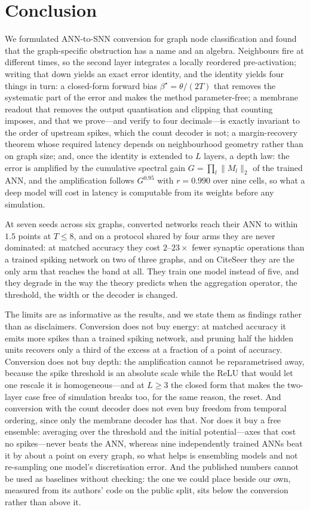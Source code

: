\documentclass[10pt,twocolumn]{article}
\newcommand{\betastar}{\beta^{\star}}
\begin{document}
\section{Conclusion}
\label{sec:conclusion}

We formulated ANN-to-SNN conversion for graph node classification and found that the graph-specific
obstruction has a name and an algebra. Neighbours fire at different times, so the second layer
integrates a locally reordered pre-activation; writing that down yields an exact error identity, and
the identity yields four things in turn: a closed-form forward bias $\betastar = \theta/(2T)$ that
removes the systematic part of the error and makes the method parameter-free; a membrane readout
that removes the output quantisation and clipping that counting imposes, and that we prove---and
verify to four decimals---is exactly invariant to the order of upstream spikes, which the count
decoder is not; a margin-recovery theorem whose required latency depends on neighbourhood geometry
rather than on graph size; and, once the identity is extended to $L$ layers, a depth law: the error
is amplified by the cumulative spectral gain $G=\prod_l\lVert M_l\rVert_2$ of the trained ANN, and
the amplification follows $G^{0.95}$ with $r=0.990$ over nine cells, so what a deep model will cost
in latency is computable from its weights before any simulation.

At seven seeds across six graphs, converted networks reach their ANN to within $1.5$ points at
$T \le 8$, and on a protocol shared by four arms they are never dominated: at matched accuracy they
cost $2$--$23\times$ fewer synaptic operations than a trained spiking network on two of three graphs,
and on CiteSeer they are the only arm that reaches the band at all. They train one model instead of
five, and they degrade in the way the theory predicts when the aggregation operator, the threshold,
the width or the decoder is changed.

The limits are as informative as the results, and we state them as findings rather than as
disclaimers. Conversion does not buy energy: at matched accuracy it emits more spikes than a trained
spiking network, and pruning half the hidden units recovers only a third of the excess at a fraction
of a point of accuracy. Conversion does not buy depth: the amplification cannot be reparametrised
away, because the spike threshold is an absolute scale while the ReLU that would let one rescale it
is homogeneous---and at $L\ge3$ the closed form that makes the two-layer case free of simulation
breaks too, for the same reason, the reset. And conversion with the count decoder does not even buy
freedom from temporal ordering, since only the membrane decoder has that. Nor does it buy a free ensemble: averaging over the threshold and the initial potential---axes that cost no spikes---never beats the ANN, whereas nine independently trained ANNs beat it by about a point on every graph, so what helps is ensembling models and not re-sampling one model's discretisation error. And the published numbers cannot be used as baselines without checking: the one we could place beside our own, measured from its authors' code on the public split, sits below the conversion rather than above it.
\end{document}
